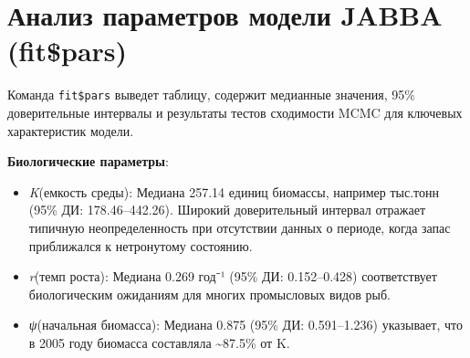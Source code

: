 \documentclass[
  letterpaper,
  DIV=11,
  numbers=noendperiod]{scrreprt}
\newenvironment{Shaded}{\begin{snugshade}}{\end{snugshade}}
\newcommand{\ConstantTok}[1]{\textcolor[rgb]{0.56,0.35,0.01}{#1}}
\newcommand{\FloatTok}[1]{\textcolor[rgb]{0.68,0.00,0.00}{#1}}
\newcommand{\NormalTok}[1]{\textcolor[rgb]{0.00,0.23,0.31}{#1}}
\newcommand{\SpecialCharTok}[1]{\textcolor[rgb]{0.37,0.37,0.37}{#1}}
\providecommand{\tightlist}{%
  \setlength{\itemsep}{0pt}\setlength{\parskip}{0pt}}
\begin{document}
\section{Анализ параметров модели JABBA
(fit\$pars)}\label{ux430ux43dux430ux43bux438ux437-ux43fux430ux440ux430ux43cux435ux442ux440ux43eux432-ux43cux43eux434ux435ux43bux438-jabba-fitpars}

Команда \texttt{fit\$pars} выведет таблицу, содержит медианные значения,
95\% доверительные интервалы и результаты тестов сходимости MCMC для
ключевых характеристик модели.

\begin{Shaded}
\end{Shaded}

\textbf{Биологические параметры}:

\begin{itemize}
\tightlist
\item
  \emph{K}(емкость среды): Медиана 257.14 единиц биомассы, например
  тыс.тонн (95\% ДИ: 178.46--442.26). Широкий доверительный интервал
  отражает типичную неопределенность при отсутствии данных о периоде,
  когда запас приближался к нетронутому состоянию.
\item
  \emph{r}(темп роста): Медиана 0.269 год⁻¹ (95\% ДИ: 0.152--0.428)
  соответствует биологическим ожиданиям для многих промысловых видов
  рыб.
\item
  \emph{ψ}(начальная биомасса): Медиана 0.875 (95\% ДИ: 0.591--1.236)
  указывает, что в 2005 году биомасса составляла \textasciitilde87.5\%
  от K.
\end{itemize}
\end{document}
